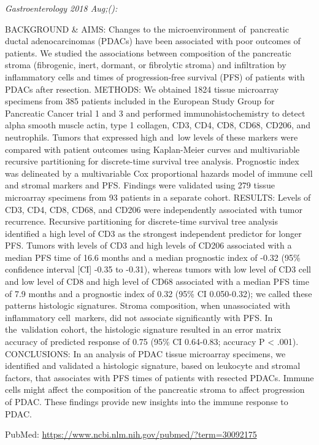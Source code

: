 \documentclass[]{article}
\begin{document}
\emph{Gastroenterology 2018 Aug;():}

BACKGROUND \& AIMS: Changes to the microenvironment of~pancreatic ductal
adenocarcinomas (PDACs) have been associated with poor outcomes of
patients. We studied the associations between composition of the
pancreatic stroma (fibrogenic, inert, dormant, or fibrolytic stroma) and
infiltration by inflammatory cells and times of progression-free
survival (PFS) of patients with PDACs after resection. METHODS: We
obtained 1824 tissue microarray specimens from 385 patients included in
the European Study Group for Pancreatic Cancer trial 1 and 3 and
performed immunohistochemistry to detect alpha smooth muscle actin, type
1 collagen, CD3, CD4, CD8, CD68, CD206, and neutrophils. Tumors that
expressed high and~low levels of these markers were compared with
patient outcomes using Kaplan-Meier curves and multivariable recursive
partitioning for discrete-time survival tree analysis. Prognostic index
was delineated by a multivariable Cox proportional hazards model of
immune cell and stromal markers and PFS. Findings were validated using
279 tissue microarray specimens from 93 patients in a separate cohort.
RESULTS: Levels of CD3, CD4, CD8, CD68, and CD206 were independently
associated with tumor recurrence. Recursive partitioning for
discrete-time survival tree analysis identified a high level of CD3 as
the strongest independent predictor for longer PFS. Tumors with levels
of CD3 and high levels of CD206 associated with a median PFS time of
16.6 months and a median prognostic index of -0.32 (95\% confidence
interval {[}CI{]} -0.35 to -0.31), whereas tumors with low level of CD3
cell and low level of CD8 and high level of CD68 associated with a
median PFS time of 7.9 months and a prognostic index of 0.32 (95\% CI
0.050-0.32); we called these patterns histologic signatures. Stroma
composition, when unassociated with inflammatory cell~markers, did not
associate significantly with PFS. In the~validation cohort, the
histologic signature resulted in an error matrix accuracy of predicted
response of 0.75 (95\% CI 0.64-0.83; accuracy P \textless{} .001).
CONCLUSIONS: In an analysis of PDAC tissue microarray specimens, we
identified and validated a histologic signature, based on leukocyte and
stromal factors, that associates with PFS times of patients with
resected PDACs. Immune cells might affect the composition of the
pancreatic stroma to affect progression of PDAC. These findings provide
new insights into the immune response to PDAC.

PubMed: \url{https://www.ncbi.nlm.nih.gov/pubmed/?term=30092175}
\end{document}
